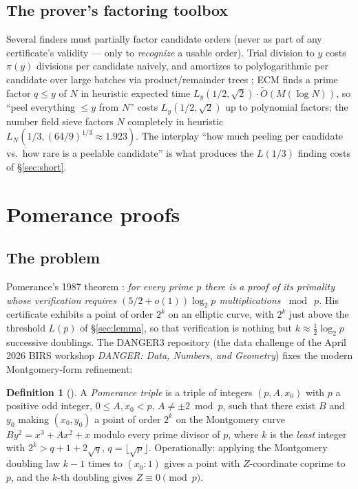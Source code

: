 \documentclass[11pt]{amsart}
\newcommand{\Ot}{\widetilde{O}}
\theoremstyle{plain}
\theoremstyle{definition}
\newtheorem{definition}[theorem]{Definition}
\theoremstyle{remark}
\begin{document}
\subsection{The prover's factoring toolbox}\label{sec:toolbox}

Several finders must partially factor candidate orders (never as part of any certificate's validity ---
only to \emph{recognize} a usable order).  Trial division to $y$ costs $\pi(y)$ divisions per candidate
naively, and amortizes to polylogarithmic per candidate over large batches via product/remainder trees
\cite{Bern04}; ECM \cite{Len87} finds a prime factor $q \le y$ of $N$ in heuristic expected time
$L_y(1/2, \sqrt 2)\cdot\Ot(M(\log N))$, so ``peel everything ${}\le y$ from $N$'' costs
$L_y(1/2, \sqrt 2)$ up to polynomial factors; the number field sieve \cite{LL93} factors $N$ completely
in heuristic $L_N(1/3, (64/9)^{1/3} \approx 1.923)$.  The interplay ``how much peeling per candidate
vs.\ how rare is a peelable candidate'' is what produces the $L(1/3)$ finding costs of
\S\ref{sec:short}.

\section{Pomerance proofs}\label{sec:pomerance}

\subsection{The problem}

Pomerance's 1987 theorem \cite[Thm.~1]{Pom87}: \emph{for every prime $p$ there is a proof of its
primality whose verification requires $(5/2+o(1))\log_2 p$ multiplications $\bmod\ p$.}  His certificate
exhibits a point of order $2^k$ on an elliptic curve, with $2^k$ just above the threshold $L(p)$ of
\S\ref{sec:lemma}, so that verification is nothing but $k \approx \frac12\log_2 p$ successive doublings.
The DANGER3 repository \cite{DANGER3} (the data challenge of the April 2026 BIRS workshop \emph{DANGER:
Data, Numbers, and Geometry}) fixes the modern Montgomery-form refinement:

\begin{definition}[{\cite{DANGER3}}]\label{def:pomtriple}
A \emph{Pomerance triple} is a triple of integers $(p, A, x_0)$ with $p$ a positive odd integer,
$0 \le A, x_0 < p$, $A \ne \pm 2 \bmod p$, such that there exist $B$ and $y_0$ making $(x_0, y_0)$ a
point of order $2^k$ on the Montgomery curve $By^2 = x^3 + Ax^2 + x$ modulo every prime divisor of $p$,
where $k$ is the \emph{least} integer with $2^k > q + 1 + 2\sqrt q$, $q = \lfloor\sqrt p\rfloor$.
Operationally: applying the Montgomery doubling law $k-1$ times to $(x_0 : 1)$ gives a point with
$Z$-coordinate coprime to $p$, and the $k$-th doubling gives $Z \equiv 0 \pmod p$.
\end{definition}
\end{document}

